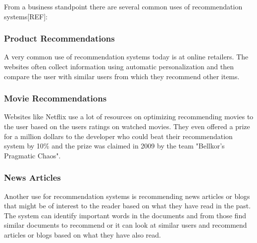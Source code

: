 From a business standpoint there are several common uses of recommendation systems[REF]:

\subsubsection{Product Recommendations}

A very common use of recommendation systems today is at online retailers. The websites often collect information using automatic personalization and then compare the user with similar users from which they recommend other items.

\subsubsection{Movie Recommendations}

Websites like Netflix use a lot of resources on optimizing recommending movies to the user based on the users ratings on watched movies. They even offered a prize for a million dollars to the developer who could beat their recommendation system by 10\% and the prize was claimed in 2009 by the team "Bellkor's Pragmatic Chaos".

\subsubsection{News Articles}

Another use for recommendation systems is recommending news articles or blogs that might be of interest to the reader based on what they have read in the past. The system can identify important words in the documents and from those find similar documents to recommend or it can look at similar users and recommend articles or blogs based on what they have also read. 